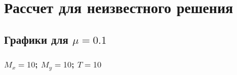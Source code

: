 \section{Рассчет для неизвестного решения}

\subsection{Графики для $\mu=0.1$} 
\subsubsection{$M_x=10$; $M_y=10$; $T=10$}
\begin{figure}[H]
\begin{minipage}[h]{0.43\linewidth}
\end{minipage}
\hfill
\begin{minipage}[h]{0.43\linewidth}
\end{minipage}
\end{figure}

